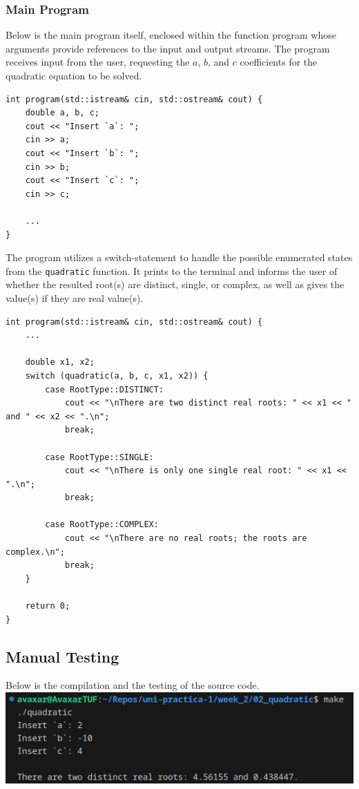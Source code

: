 \documentclass[12pt]{article}
\begin{document}
\subsubsection{Main Program}
Below is the main program itself, enclosed within the function program whose arguments provide references to the input and output streams. The program receives input from the user, requesting the $a$, $b$, and $c$ coefficients for the quadratic equation to be solved.

\begin{verbatim}
int program(std::istream& cin, std::ostream& cout) {
    double a, b, c;
    cout << "Insert `a`: ";
    cin >> a;
    cout << "Insert `b`: ";
    cin >> b;
    cout << "Insert `c`: ";
    cin >> c;

    ...
}
\end{verbatim}

The program utilizes a switch-statement to handle the possible enumerated states from the \texttt{quadratic} function. It prints to the terminal and informs the user of whether the resulted root(s) are distinct, single, or complex, as well as gives the value(s) if they are real value(s).

\begin{verbatim}
int program(std::istream& cin, std::ostream& cout) {
    ...

    double x1, x2;
    switch (quadratic(a, b, c, x1, x2)) {
        case RootType::DISTINCT:
            cout << "\nThere are two distinct real roots: " << x1 << " and " << x2 << ".\n";
            break;

        case RootType::SINGLE:
            cout << "\nThere is only one single real root: " << x1 << ".\n";
            break;

        case RootType::COMPLEX:
            cout << "\nThere are no real roots; the roots are complex.\n";
            break;
    }

    return 0;
}
\end{verbatim}

\subsection{Manual Testing}
Below is the compilation and the testing of the source code.
\newline\includegraphics[width=\textwidth]{02_quadratic}
\end{document}
